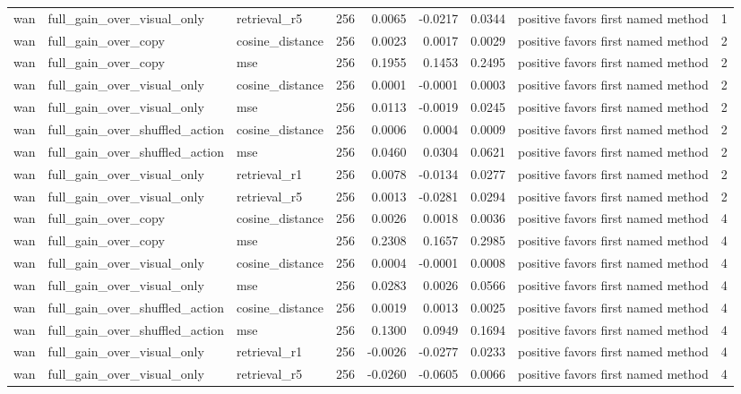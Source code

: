\begin{tabular}{lllrrrrlr}
wan & full\_gain\_over\_visual\_only & retrieval\_r5 & 256 & 0.0065 & -0.0217 & 0.0344 & positive favors first named method & 1 \\
wan & full\_gain\_over\_copy & cosine\_distance & 256 & 0.0023 & 0.0017 & 0.0029 & positive favors first named method & 2 \\
wan & full\_gain\_over\_copy & mse & 256 & 0.1955 & 0.1453 & 0.2495 & positive favors first named method & 2 \\
wan & full\_gain\_over\_visual\_only & cosine\_distance & 256 & 0.0001 & -0.0001 & 0.0003 & positive favors first named method & 2 \\
wan & full\_gain\_over\_visual\_only & mse & 256 & 0.0113 & -0.0019 & 0.0245 & positive favors first named method & 2 \\
wan & full\_gain\_over\_shuffled\_action & cosine\_distance & 256 & 0.0006 & 0.0004 & 0.0009 & positive favors first named method & 2 \\
wan & full\_gain\_over\_shuffled\_action & mse & 256 & 0.0460 & 0.0304 & 0.0621 & positive favors first named method & 2 \\
wan & full\_gain\_over\_visual\_only & retrieval\_r1 & 256 & 0.0078 & -0.0134 & 0.0277 & positive favors first named method & 2 \\
wan & full\_gain\_over\_visual\_only & retrieval\_r5 & 256 & 0.0013 & -0.0281 & 0.0294 & positive favors first named method & 2 \\
wan & full\_gain\_over\_copy & cosine\_distance & 256 & 0.0026 & 0.0018 & 0.0036 & positive favors first named method & 4 \\
wan & full\_gain\_over\_copy & mse & 256 & 0.2308 & 0.1657 & 0.2985 & positive favors first named method & 4 \\
wan & full\_gain\_over\_visual\_only & cosine\_distance & 256 & 0.0004 & -0.0001 & 0.0008 & positive favors first named method & 4 \\
wan & full\_gain\_over\_visual\_only & mse & 256 & 0.0283 & 0.0026 & 0.0566 & positive favors first named method & 4 \\
wan & full\_gain\_over\_shuffled\_action & cosine\_distance & 256 & 0.0019 & 0.0013 & 0.0025 & positive favors first named method & 4 \\
wan & full\_gain\_over\_shuffled\_action & mse & 256 & 0.1300 & 0.0949 & 0.1694 & positive favors first named method & 4 \\
wan & full\_gain\_over\_visual\_only & retrieval\_r1 & 256 & -0.0026 & -0.0277 & 0.0233 & positive favors first named method & 4 \\
wan & full\_gain\_over\_visual\_only & retrieval\_r5 & 256 & -0.0260 & -0.0605 & 0.0066 & positive favors first named method & 4 \\
\bottomrule
\end{tabular}
